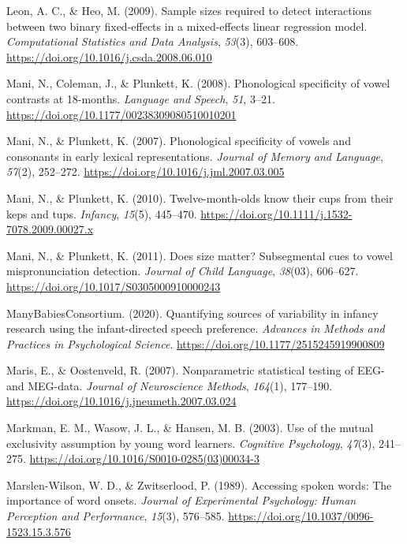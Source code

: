 \documentclass[
  english,
  man, noextraspace]{apa6}
\newlength{\cslhangindent}
\newenvironment{cslreferences}%
  {\setlength{\parindent}{0pt}%
  \everypar{\setlength{\hangindent}{\cslhangindent}}\ignorespaces}%
  {\par}
\begin{document}
\begin{cslreferences}
\leavevmode\hypertarget{ref-Leon2009}{}%
Leon, A. C., \& Heo, M. (2009). Sample sizes required to detect interactions between two binary fixed-effects in a mixed-effects linear regression model. \emph{Computational Statistics and Data Analysis}, \emph{53}(3), 603--608. \url{https://doi.org/10.1016/j.csda.2008.06.010}

\leavevmode\hypertarget{ref-Mani2008}{}%
Mani, N., Coleman, J., \& Plunkett, K. (2008). Phonological specificity of vowel contrasts at 18-months. \emph{Language and Speech}, \emph{51}, 3--21. \url{https://doi.org/10.1177/00238309080510010201}

\leavevmode\hypertarget{ref-Mani2007}{}%
Mani, N., \& Plunkett, K. (2007). Phonological specificity of vowels and consonants in early lexical representations. \emph{Journal of Memory and Language}, \emph{57}(2), 252--272. \url{https://doi.org/10.1016/j.jml.2007.03.005}

\leavevmode\hypertarget{ref-Mani2010kepstups}{}%
Mani, N., \& Plunkett, K. (2010). Twelve-month-olds know their cups from their keps and tups. \emph{Infancy}, \emph{15}(5), 445--470. \url{https://doi.org/10.1111/j.1532-7078.2009.00027.x}

\leavevmode\hypertarget{ref-Mani2011}{}%
Mani, N., \& Plunkett, K. (2011). Does size matter? Subsegmental cues to vowel mispronunciation detection. \emph{Journal of Child Language}, \emph{38}(03), 606--627. \url{https://doi.org/10.1017/S0305000910000243}

\leavevmode\hypertarget{ref-MB1}{}%
ManyBabiesConsortium. (2020). Quantifying sources of variability in infancy research using the infant-directed speech preference. \emph{Advances in Methods and Practices in Psychological Science}. \url{https://doi.org/10.1177/2515245919900809}

\leavevmode\hypertarget{ref-Maris2007}{}%
Maris, E., \& Oostenveld, R. (2007). Nonparametric statistical testing of EEG- and MEG-data. \emph{Journal of Neuroscience Methods}, \emph{164}(1), 177--190. \url{https://doi.org/10.1016/j.jneumeth.2007.03.024}

\leavevmode\hypertarget{ref-Markman2003}{}%
Markman, E. M., Wasow, J. L., \& Hansen, M. B. (2003). Use of the mutual exclusivity assumption by young word learners. \emph{Cognitive Psychology}, \emph{47}(3), 241--275. \url{https://doi.org/10.1016/S0010-0285(03)00034-3}

\leavevmode\hypertarget{ref-Marslen-Wilson1989}{}%
Marslen-Wilson, W. D., \& Zwitserlood, P. (1989). Accessing spoken words: The importance of word onsets. \emph{Journal of Experimental Psychology: Human Perception and Performance}, \emph{15}(3), 576--585. \url{https://doi.org/10.1037/0096-1523.15.3.576}


\end{cslreferences}
\end{document}
